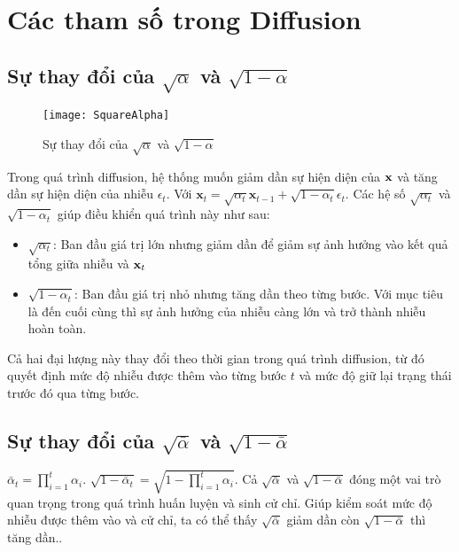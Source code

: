 \appendix
\renewcommand{\chaptername}{Phụ lục}
\chapter{Các tham số trong Diffusion}
 \label{appendix:Appendix1}

\section{Sự thay đổi của $\sqrt{\alpha}$ và $\sqrt{1 - \alpha}$}

\begin{figure}[H]
	\texttt{[image: SquareAlpha]}
	\label{fig:wrapfig}
	\caption{Sự thay đổi của $\sqrt{\alpha}$ và $\sqrt{1 - \alpha}$}
\end{figure}

Trong quá trình diffusion, hệ thống muốn giảm dần sự hiện diện của $\mathbf{x}$ và tăng dần sự hiện diện của nhiễu $\epsilon_t$. Với $\mathbf{x}_{t} = \sqrt{\alpha_t} \mathbf{x}_{t-1} + \sqrt{1 - \alpha_t} \epsilon_t$. Các hệ số $\sqrt{\alpha_t}$ và $\sqrt{1 - \alpha_t}$ giúp điều khiển quá trình này như sau:



\begin{itemize}
	\item $\sqrt{\alpha_t}$: Ban đầu giá trị lớn nhưng giảm dần để giảm sự ảnh hưởng vào kết quả tổng giữa nhiễu và $\mathbf{x}_t$
	\item $\sqrt{1 - \alpha_t}$: Ban đầu giá trị nhỏ nhưng tăng dần theo từng bước. Với mục tiêu là đến cuối cùng thì sự ảnh hưởng của nhiễu càng lớn và trở thành nhiễu hoàn toàn.
\end{itemize}

Cả hai đại lượng này thay đổi theo thời gian trong quá trình diffusion, từ đó quyết định mức độ nhiễu được thêm vào từng bước $t$ và mức độ giữ lại trạng thái trước đó qua từng bước.


\section{Sự thay đổi của $\sqrt{\bar{\alpha}}$ và $\sqrt{1 - \bar{\alpha}}$}

$\bar{\alpha}_t = \prod_{i=1}^t \alpha_i$.  $\sqrt{1 - \bar{\alpha}_t} = \sqrt{1 - \prod_{i=1}^t \alpha_i}$. Cả $\sqrt{\bar{\alpha}}$ và $\sqrt{1 - \bar{\alpha}}$ đóng một vai trò quan trọng trong quá trình huấn luyện và sinh cử chỉ. Giúp kiểm soát mức độ nhiễu được thêm vào và cử chỉ, ta có thể thấy $\sqrt{\bar{\alpha}}$ giảm dần còn $\sqrt{1 - \bar{\alpha}}$ thì tăng dần..


